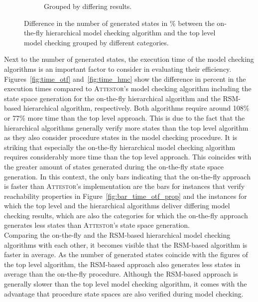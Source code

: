 \documentclass[a4paper, 12pt, twoside]{report}
\begin{document}
\begin{figure}
\begin{center}
\begin{subfigure}{0.45\textwidth}
\begin{center}
				\caption{Grouped by differing results.}\label{fig:bar_states_otf_hier}
			\end{center}
		\end{subfigure}	
	\caption{Difference in the number of generated states in \% between the on-the-fly hierarchical model checking algorithm and the top level model checking grouped by different categories.}\label{fig:state_otf}
	\end{center}
	\end{figure}

	Next to the number of generated states, the execution time of the model checking algorithms is an important factor to consider in evaluating their efficiency. Figures~\ref{fig:time_otf} and~\ref{fig:time_hmc} show the difference in percent in the execution times compared to \textsc{Attestor}'s model checking algorithm including the state space generation for the on-the-fly hierarchical algorithm and the RSM-based hierarchical algorithm, respectively. Both algorithms require around 108\% or 77\% more time than the top level approach. This is due to the fact that the hierarchical algorithms generally verify more states than the top level algorithm as they also consider procedure states in the model checking procedure. It is striking that especially the on-the-fly hierarchical model checking algorithm requires considerably more time than the top level approach. This coincides with the greater amount of states generated during the on-the-fly state space generation. In this context, the only bars indicating that the on-the-fly approach is faster than \textsc{Attestor}'s implementation are the bars for instances that verify reachability properties in Figure~\ref{fig:bar_time_otf_prop} and the instances for which the top level and the hierarchical algorithms deliver differing model checking results, which are also the categories for which the on-the-fly approach generates less states than \textsc{Attestor}'s state space generation. \\
	
	Comparing the on-the-fly and the RSM-based hierarchical model checking algorithms with each other, it becomes visible that the RSM-based algorithm is faster in average. As the number of generated states coincide with the figures of the top level algorithm, the RSM-based approach also generates less states in average than the on-the-fly procedure. Although the RSM-based approach is generally slower than the top level model checking algorithm, it comes with the advantage that procedure state spaces are also verified during model checking.
	
\end{document}
